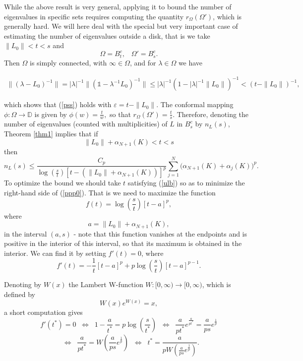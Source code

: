 \documentclass[12pt,a4paper]{article}
\theoremstyle{definition}
\theoremstyle{remark}
\numberwithin{equation}{section}
\newcommand{\md}{{\mathbb D}}
\renewcommand{\epsilon}{\varepsilon}
\begin{document}
While the above result is very general, applying it to bound the number of eigenvalues in specific sets requires computing the quantity
$r_{\Omega}(\Omega')$, which is generally hard. We will here deal with the special but very important case of estimating the number of eigenvalues outside a disk, that
is we take $\|L_0\|<t<s$ and
$$\Omega=B_{t}^c,\;\;\;\Omega'= B_{s}^c.$$ 
Then $\Omega$ is simply connected, with $\infty \in \Omega$, and for $\lambda \in \Omega$ we have 
\begin{small}
\begin{eqnarray*}
  \|(\lambda-L_0)^{-1}\| = |\lambda|^{-1} \|(\mathds{1}-\lambda^{-1}L_0)^{-1}\| 
\leq |\lambda|^{-1} (1-|\lambda|^{-1}\|L_0\|)^{-1} < (t-\|L_0\|)^{-1},
\end{eqnarray*}
\end{small}
which shows that (\ref{pss}) holds with $\epsilon=t-\|L_0\|$.
The conformal mapping $\phi: \Omega\rightarrow \md$ is given by
$\phi(w)=\frac{t}{w},$ so that $r_{\Omega}(\Omega')=\frac{t}{s}$.
Therefore, denoting the number of eigenvalues (counted with multiplicities) of $L$ in $B_s^c$ by $n_L(s)$,  Theorem \ref{thm1} implies 
that if 
\begin{equation}\label{ulb}\|L_0\|+\alpha_{N+1}(K)<t<s\end{equation} 
then
	\begin{equation}\label{ppp0}
	n_L(s) \leq \frac{C_p  }{\log\left(\frac{s}{t}\right)[t-(\|L_0\|+\alpha_{N+1}(K))]^p}\sum_{j=1}^N\Big( \alpha_{N+1}(K) + \alpha_j(K) \Big)^p .
	\end{equation}
To optimize the bound we should take $t$ satisfying (\ref{ulb}) so as to minimize the right-hand side of (\ref{ppp0}). That is we need to 
maximize the function 
$$f(t)=\log\left(\frac{s}{t}\right)[t-a]^p,$$
where $$a=\|L_0\|+\alpha_{N+1}(K),$$
in the interval $(a,s)$ - note that this function vanishes at the endpoints and is positive in the interior of this interval, so that its
maximum is obtained in the interior. We can find it by setting $f'(t)=0$, where
$$f'(t)=-\frac{1}{t}[t-a]^p+p \log\left(\frac{s}{t}\right)[t-a]^{p-1}.$$

Denoting by $W(x)$ the Lambert W-function $W:[0,\infty)\rightarrow [0,\infty)$, which is defined by 
$$W(x)e^{W(x)}=x,$$
a short computation gives 
$$f'(t^*)=0\;\;\Leftrightarrow\;\; 1-\frac{a}{t^*}=p \log\left(\frac{s}{t^*}\right)\;\;\Leftrightarrow\;\;\frac{a}{pt^*}e^{\frac{a}{pt^*}}=\frac{a}{ps}e^{\frac{1}{p} }$$
$$\;\;\Leftrightarrow\;\;\frac{a}{pt^*}=W\left(\frac{a}{ps}e^{\frac{1}{p} }\right)\;\;\Leftrightarrow\;\;t^*=\frac{a}{pW\left(\frac{a}{ps}e^{\frac{1}{p} }\right)}.$$
\end{document}
